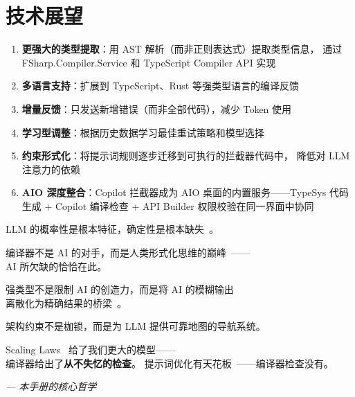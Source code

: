 \documentclass[10pt, openany]{book}
\begin{document}
\section*{技术展望}

\begin{enumerate}
    \item \textbf{更强大的类型提取}：用 AST 解析（而非正则表达式）提取类型信息，
        通过 FSharp.Compiler.Service 和 TypeScript Compiler API 实现
    \item \textbf{多语言支持}：扩展到 TypeScript、Rust 等强类型语言的编译反馈
    \item \textbf{增量反馈}：只发送新增错误（而非全部代码），减少 Token 使用
    \item \textbf{学习型调整}：根据历史数据学习最佳重试策略和模型选择
    \item \textbf{约束形式化}：将提示词规则逐步迁移到可执行的拦截器代码中，
        降低对 LLM 注意力的依赖
    \item \textbf{AIO 深度整合}：Copilot 拦截器成为 AIO 桌面的内置服务——TypeSys 代码生成 + Copilot 编译检查 + API Builder 权限校验在同一界面中协同
\end{enumerate}

\vspace{2em}

\begin{framed}
\centering
\large LLM 的概率性是根本特征，确定性是根本缺失~\cite{Brown2020LanguageModels,Vaswani2017Attention}。

编译器不是 AI 的对手，而是人类形式化思维的巅峰~\cite{Aho2006Compilers}——\\
AI 所欠缺的恰恰在此。

强类型不是限制 AI 的创造力，而是将 AI 的模糊输出\\
离散化为精确结果的桥梁~\cite{Pierce2002TAPL}。

架构约束不是枷锁，而是为 LLM 提供可靠地图的导航系统。

\vspace{0.5em}
Scaling Laws~\cite{Kaplan2020Scaling} 给了我们更大的模型——\\
编译器给出了\textbf{从不失忆的检查}。
提示词优化有天花板~\cite{Liu2023LostInMiddle}——编译器检查没有。

\vspace{0.5em}
\textit{--- 本手册的核心哲学}
\end{framed}

\backmatter

\printbibliography[heading=bibintoc]
\end{document}

